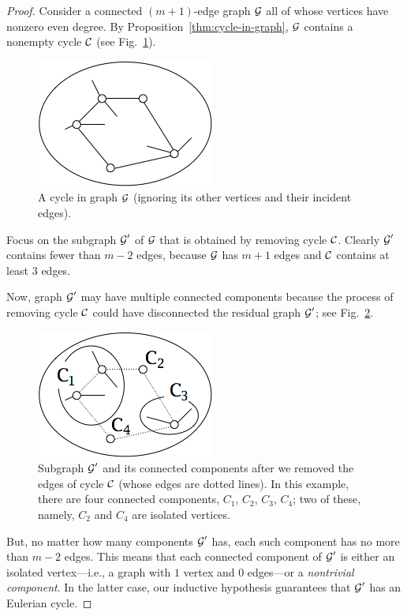 \begin{proof}
Consider a connected $(m+1)$-edge graph $\mbox{$\cal G$}$ all of whose vertices have nonzero even degree.
By Proposition~\ref{thm:cycle-in-graph}, $\mbox{$\cal G$}$ contains a nonempty cycle $\mbox{$\cal C$}$ (see Fig.~\ref{fig:eulerianProof1}). 
\begin{figure}[hbt]
\begin{center}
       \includegraphics[scale=0.45]{FiguresGraph/EulerianProof1}
       \caption{A cycle in graph $\mbox{$\cal G$}$ (ignoring its other vertices and their incident edges).}
  \label{fig:eulerianProof1}
\end{center}
\end{figure}
Focus on the subgraph $\mbox{$\cal G$}'$ of $\mbox{$\cal G$}$ that is obtained by removing cycle $\mbox{$\cal C$}$.  Clearly $\mbox{$\cal G$}'$ contains fewer than $m-2$ edges, because $\mbox{$\cal G$}$ has $m+1$ edges and $\mbox{$\cal C$}$ contains at least $3$ edges.

\smallskip

Now,  graph $\mbox{$\cal G$}'$ may have multiple connected components because the process of removing cycle $\mbox{$\cal C$}$ could have disconnected the residual graph $\mbox{$\cal G$}'$; see Fig.~\ref{fig:eulerianProof2}.
\begin{figure}[hbt]
\begin{center}
       \includegraphics[scale=0.45]{FiguresGraph/EulerianProof2}
 \caption{Subgraph $\mbox{$\cal G$}'$ and its connected components after we removed the edges of cycle $\mbox{$\cal C$}$ (whose edges are dotted lines).  In this example, there are four connected components, $C_1$, $C_2$, $C_3$, $C_4$; two of these, namely, $C_2$ and $C_4$ are isolated vertices.}
  \label{fig:eulerianProof2}
\end{center}
\end{figure}
But, no matter how many components $\mbox{$\cal G$}'$ has, each such component has no more than $m-2$ edges.  This means that each connected component of $\mbox{$\cal G$}'$ is either an isolated vertex---i.e., a graph with $1$ vertex and $0$ edges---or a {\em nontrivial component}.  In the latter case, our inductive hypothesis guarantees that $\mbox{$\cal G$}'$ has an Eulerian cycle.


\end{proof}
